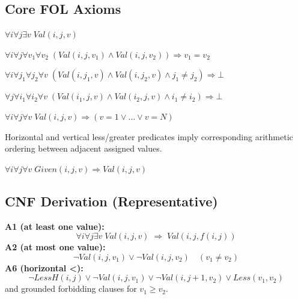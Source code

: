 \documentclass[12pt,a4paper]{article}
\begin{document}
\subsection{Core FOL Axioms}
\begin{axiombox}[A1 -- Existence]
$\forall i\forall j\exists v\; Val(i,j,v)$
\end{axiombox}
\begin{axiombox}
$\forall i\forall j\forall v_1\forall v_2\;(Val(i,j,v_1)\land Val(i,j,v_2))\Rightarrow v_1=v_2$
\end{axiombox}
\begin{axiombox}
$\forall i\forall j_1\forall j_2\forall v\;(Val(i,j_1,v)\land Val(i,j_2,v)\land j_1\neq j_2)\Rightarrow \bot$
\end{axiombox}
\begin{axiombox}
$\forall j\forall i_1\forall i_2\forall v\;(Val(i_1,j,v)\land Val(i_2,j,v)\land i_1\neq i_2)\Rightarrow \bot$
\end{axiombox}
\begin{axiombox}
$\forall i\forall j\forall v\; Val(i,j,v)\Rightarrow (v=1\lor\dots\lor v=N)$
\end{axiombox}
\begin{axiombox}
Horizontal and vertical less/greater predicates imply corresponding arithmetic ordering between adjacent assigned values.
\end{axiombox}
\begin{axiombox}
$\forall i\forall j\forall v\; Given(i,j,v)\Rightarrow Val(i,j,v)$
\end{axiombox}

\subsection{CNF Derivation (Representative)}
\textbf{A1 (at least one value):}
\[
\forall i\forall j\exists v\;Val(i,j,v)\;\Rightarrow\;Val(i,j,f(i,j))
\]
\textbf{A2 (at most one value):}
\[
\neg Val(i,j,v_1)\lor \neg Val(i,j,v_2)\quad (v_1\neq v_2)
\]
\textbf{A6 (horizontal <):}
\[
\neg LessH(i,j)\lor\neg Val(i,j,v_1)\lor\neg Val(i,j+1,v_2)\lor Less(v_1,v_2)
\]
and grounded forbidding clauses for $v_1\ge v_2$.

\end{document}
